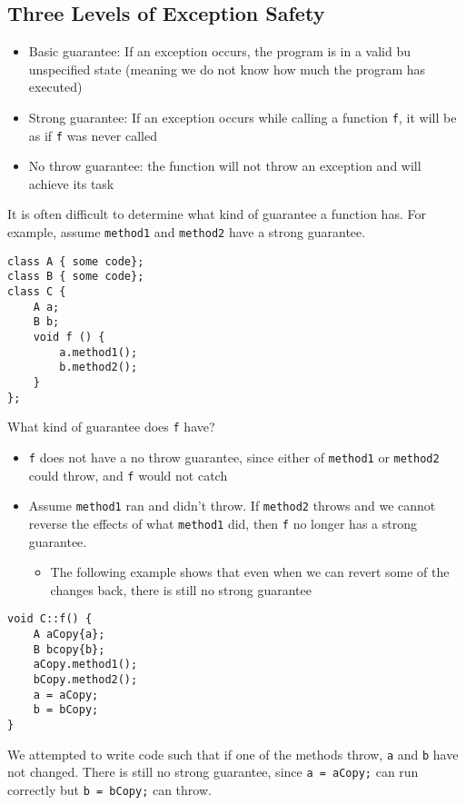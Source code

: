 \documentclass[12pt]{article}
\begin{document}
\subsection{Three Levels of Exception Safety}
\begin{itemize}
    \item Basic guarantee: If an exception occurs, the program is in a valid bu unspecified state (meaning we do not know how much the program has executed)
    \item Strong guarantee: If an exception occurs while calling a function \lstinline{f}, it will be as if \lstinline{f} was never called
    \item No throw guarantee: the function will not throw an exception and will achieve its task
\end{itemize}
It is often difficult to determine what kind of guarantee a function has. For example, assume \lstinline{method1} and \lstinline{method2} have a strong guarantee.
\begin{lstlisting}
class A { some code};
class B { some code};
class C {
    A a;
    B b;
    void f () {
        a.method1();
        b.method2();
    }
};
\end{lstlisting}
What kind of guarantee does \lstinline{f} have?
\begin{itemize}
    \item \lstinline{f} does not have a no throw guarantee, since either of \lstinline{method1} or \lstinline{method2} could throw, and \lstinline{f} would not catch
    \item Assume \lstinline{method1} ran and didn't throw. If \lstinline{method2} throws and we cannot reverse the effects of what \lstinline{method1} did, then \lstinline{f} no longer has a strong guarantee.
    \begin{itemize}
        \item The following example shows that even when we can revert some of the changes back, there is still no strong guarantee
    \end{itemize}
\end{itemize}
\begin{lstlisting}
void C::f() {
    A aCopy{a};
    B bcopy{b};
    aCopy.method1();
    bCopy.method2();
    a = aCopy;
    b = bCopy;
}
\end{lstlisting}
We attempted to write code such that if one of the methods throw, \lstinline{a} and \lstinline{b} have not changed. There is still no strong guarantee, since \lstinline{a = aCopy;} can run correctly but \lstinline{b = bCopy;} can throw. 
\end{document}
